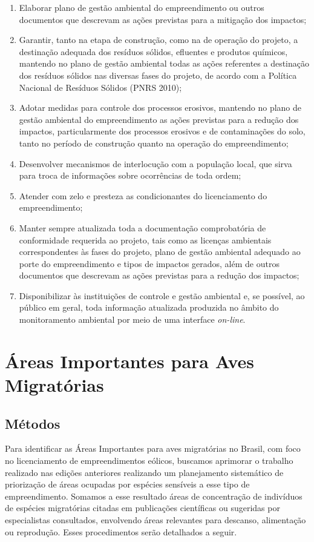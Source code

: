 \documentclass[
  oneside]{scrbook}
\begin{document}
\begin{enumerate}
\item
  Elaborar plano de gestão ambiental do empreendimento ou outros documentos que descrevam as ações previstas para a mitigação dos impactos;
\item
  Garantir, tanto na etapa de construção, como na de operação do projeto, a destinação adequada dos resíduos sólidos, efluentes e produtos químicos, mantendo no plano de gestão ambiental todas as ações referentes a destinação dos resíduos sólidos nas diversas fases do projeto, de acordo com a Política Nacional de Resíduos Sólidos (PNRS 2010);
\item
  Adotar medidas para controle dos processos erosivos, mantendo no plano de gestão ambiental do empreendimento as ações previstas para a redução dos impactos, particularmente dos processos erosivos e de contaminações do solo, tanto no período de construção quanto na operação do empreendimento;
\item
  Desenvolver mecanismos de interlocução com a população local, que sirva para troca de informações sobre ocorrências de toda ordem;
\item
  Atender com zelo e presteza as condicionantes do licenciamento do empreendimento;
\item
  Manter sempre atualizada toda a documentação comprobatória de conformidade requerida ao projeto, tais como as licenças ambientais correspondentes às fases do projeto, plano de gestão ambiental adequado ao porte do empreendimento e tipos de impactos gerados, além de outros documentos que descrevam as ações previstas para a redução dos impactos;
\item
  Disponibilizar às instituições de controle e gestão ambiental e, se possível, ao público em geral, toda informação atualizada produzida no âmbito do monitoramento ambiental por meio de uma interface \emph{on-line}.
\end{enumerate}

\hypertarget{areas-importantes}{%
\section{Áreas Importantes para Aves Migratórias}\label{areas-importantes}}

\hypertarget{metodos}{%
\subsection{Métodos}\label{metodos}}

Para identificar as Áreas Importantes para aves migratórias no Brasil, com foco no licenciamento de empreendimentos eólicos, buscamos aprimorar o trabalho realizado nas edições anteriores realizando um planejamento sistemático de priorização de áreas ocupadas por espécies sensíveis a esse tipo de empreendimento. Somamos a esse resultado áreas de concentração de indivíduos de espécies migratórias citadas em publicações científicas ou sugeridas por especialistas consultados, envolvendo áreas relevantes para descanso, alimentação ou reprodução. Esses procedimentos serão detalhados a seguir.
\end{document}

